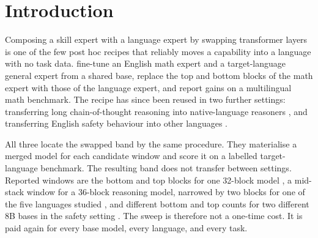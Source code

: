 \documentclass[10pt]{article}
\theoremstyle{plain}
\theoremstyle{definition}
\theoremstyle{remark}
\begin{document}
\begin{abstract}
$0.988$, while the P2 real-donor values were $0.964$, $1.000$, and $1.000$.
The standalone float64 adjoint fixture gave relative error
$9.45\times10^{-6}$. Exhaustive E1 sweeps over 406 contiguous windows gave
Spearman $0.991$, $0.985$, and $0.990$ for Spanish, Chinese, and Swahili,
respectively, with zero merged models during selection. Utility regret was
$23.6\%$, $14.7\%$, and $88.2\%$ of the achievable positive gain; the
predeclared gate therefore passes for Spanish and Chinese but stops for
Swahili's regret guard. These are gate artifacts rather than final
language-model claims: the eight-item dev diagnostic had zero next-token
accuracy for every host and selected window, and drift, free-generation
accuracy, retained capability, and test-set results remain unmeasured.
\end{abstract}

\section{Introduction}

Composing a skill expert with a language expert by swapping transformer layers
is one of the few post hoc recipes that reliably moves a capability into a
language with no task data. \citet{bandarkar2025layerswap} fine-tune an English
math expert and a target-language general expert from a shared base, replace the
top and bottom blocks of the math expert with those of the language expert, and
report gains on a multilingual math benchmark. The recipe has since been
reused in two further settings: transferring long chain-of-thought reasoning
into native-language reasoners \citep{lasbordes2026rethinking}, and
transferring English safety behaviour into other languages
\citep{shin2026safetyswap}.

All three locate the swapped band by the same procedure. They materialise a
merged model for each candidate window and score it on a labelled
target-language benchmark. The resulting band does not transfer between
settings. Reported windows are the bottom and top blocks for one 32-block
model \citep{bandarkar2025layerswap}, a mid-stack window for a 36-block
reasoning model, narrowed by two blocks for one of the five languages studied
\citep{lasbordes2026rethinking}, and different bottom and top counts for two
different 8B bases in the safety setting
\citep{shin2026safetyswap}. The sweep is therefore not a one-time
cost. It is paid again for every base model, every language, and every task.
\end{document}
